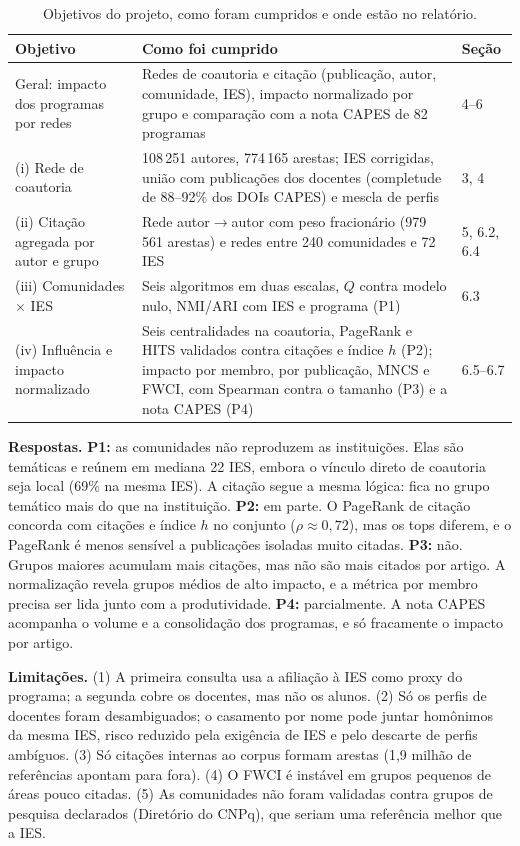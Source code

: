 \documentclass[12pt]{projeto}
\begin{document}
\begin{table}[htbp]
\centering
\small
\caption{Objetivos do projeto, como foram cumpridos e onde estão no relatório.}
\label{tab:objetivos}
\begin{tabular}{p{3.6cm}p{9.2cm}p{1.6cm}}
\hline
Objetivo & Como foi cumprido & Seção \\
\hline
Geral: impacto dos programas por redes & Redes de coautoria e citação (publicação, autor, comunidade, IES), impacto normalizado por grupo e comparação com a nota CAPES de 82 programas & 4--6 \\
(i) Rede de coautoria & 108\,251 autores, 774\,165 arestas; IES corrigidas, união com publicações dos docentes (completude de 88--92\% dos DOIs CAPES) e mescla de perfis & 3, 4 \\
(ii) Citação agregada por autor e grupo & Rede autor$\to$autor com peso fracionário (979\,561 arestas) e redes entre 240 comunidades e 72 IES & 5, 6.2, 6.4 \\
(iii) Comunidades $\times$ IES & Seis algoritmos em duas escalas, $Q$ contra modelo nulo, NMI/ARI com IES e programa (P1) & 6.3 \\
(iv) Influência e impacto normalizado & Seis centralidades na coautoria, PageRank e HITS validados contra citações e índice $h$ (P2); impacto por membro, por publicação, MNCS e FWCI, com Spearman contra o tamanho (P3) e a nota CAPES (P4) & 6.5--6.7 \\
\hline
\end{tabular}
\end{table}

\textbf{Respostas.} \textbf{P1:} as comunidades não reproduzem as instituições. Elas são temáticas e reúnem em mediana 22 IES, embora o vínculo direto de coautoria seja local (69\% na mesma IES). A citação segue a mesma lógica: fica no grupo temático mais do que na instituição. \textbf{P2:} em parte. O PageRank de citação concorda com citações e índice $h$ no conjunto ($\rho \approx 0{,}72$), mas os tops diferem, e o PageRank é menos sensível a publicações isoladas muito citadas. \textbf{P3:} não. Grupos maiores acumulam mais citações, mas não são mais citados por artigo. A normalização revela grupos médios de alto impacto, e a métrica por membro precisa ser lida junto com a produtividade. \textbf{P4:} parcialmente. A nota CAPES acompanha o volume e a consolidação dos programas, e só fracamente o impacto por artigo.

\textbf{Limitações.} (1) A primeira consulta usa a afiliação à IES como proxy do programa; a segunda cobre os docentes, mas não os alunos. (2) Só os perfis de docentes foram desambiguados; o casamento por nome pode juntar homônimos da mesma IES, risco reduzido pela exigência de IES e pelo descarte de perfis ambíguos. (3) Só citações internas ao corpus formam arestas (1,9 milhão de referências apontam para fora). (4) O FWCI é instável em grupos pequenos de áreas pouco citadas. (5) As comunidades não foram validadas contra grupos de pesquisa declarados (Diretório do CNPq), que seriam uma referência melhor que a IES.
\end{document}
